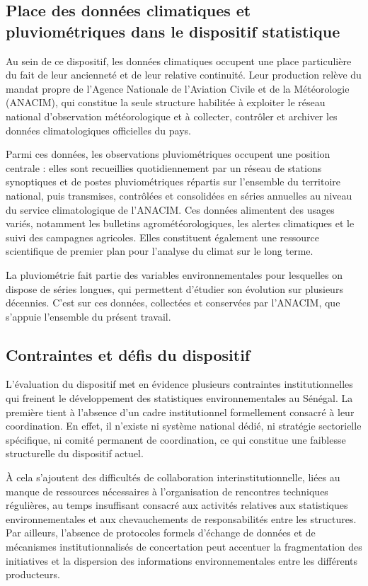 \documentclass[12pt,a4paper]{report}
\begin{document}
\subsection{Place des données climatiques et pluviométriques dans le dispositif statistique}

Au sein de ce dispositif, les données climatiques occupent une place particulière du fait de leur ancienneté et de leur relative continuité. Leur production relève du mandat propre de l'Agence Nationale de l'Aviation Civile et de la Météorologie (ANACIM), qui constitue la seule structure habilitée à exploiter le réseau national d'observation météorologique et à collecter, contrôler et archiver les données climatologiques officielles du pays.

Parmi ces données, les observations pluviométriques occupent une position centrale : elles sont recueillies quotidiennement par un réseau de stations synoptiques et de postes pluviométriques répartis sur l'ensemble du territoire national, puis transmises, contrôlées et consolidées en séries annuelles au niveau du service climatologique de l'ANACIM. Ces données alimentent des usages variés, notamment les bulletins agrométéorologiques, les alertes climatiques et le suivi des campagnes agricoles. Elles constituent également une ressource scientifique de premier plan pour l'analyse du climat sur le long terme.

La pluviométrie fait partie des variables environnementales pour lesquelles on dispose de séries longues, qui permettent d’étudier son évolution sur plusieurs décennies. C’est sur ces données, collectées et conservées par l’ANACIM, que s’appuie l’ensemble du présent travail.

\subsection{Contraintes et défis du dispositif}

L'évaluation du dispositif met en évidence plusieurs contraintes institutionnelles qui freinent le développement des statistiques environnementales au Sénégal. La première tient à l'absence d'un cadre institutionnel formellement consacré à leur coordination. En effet, il n'existe ni système national dédié, ni stratégie sectorielle spécifique, ni comité permanent de coordination, ce qui constitue une faiblesse structurelle du dispositif actuel.

À cela s'ajoutent des difficultés de collaboration interinstitutionnelle, liées au manque de ressources nécessaires à l'organisation de rencontres techniques régulières, au temps insuffisant consacré aux activités relatives aux statistiques environnementales et aux chevauchements de responsabilités entre les structures. Par ailleurs, l'absence de protocoles formels d'échange de données et de mécanismes institutionnalisés de concertation peut accentuer la fragmentation des initiatives et la dispersion des informations environnementales entre les différents producteurs.
\end{document}
